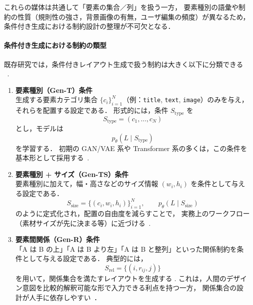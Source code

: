 \documentclass[a4j,12pt,dvipdfmx]{jsreport}
\begin{document}
これらの媒体は共通して「要素の集合／列」を扱う一方，
要素種別の語彙や制約の性質（規則性の強さ，背景画像の有無，ユーザ編集の頻度）が異なるため，
条件付き生成における制約設計の整理が不可欠となる．

\vspace{0.5em}
\paragraph{条件付き生成における制約の類型}
既存研究では，条件付きレイアウト生成で扱う制約は大きく以下に分類できる
~\cite{shi_understanding_2023}.

\begin{enumerate}
   \item \textbf{要素種別（Gen-T）条件}\\
         生成する要素カテゴリ集合 $\{c_i\}_{i=1}^{N}$（例：\texttt{title}, \texttt{text}, \texttt{image}）のみを与え，
         それらを配置する設定である．
         形式的には，条件 $S_{\text{type}}$ を
         \begin{equation}
            S_{\text{type}} = (c_1,\ldots,c_N)
         \end{equation}
         とし，モデルは
         \begin{equation}
            p_\theta(L \mid S_{\text{type}})
         \end{equation}
         を学習する．
         初期の GAN/VAE 系や Transformer 系の多くは，この条件を基本形として採用する~\cite{lee2020neuraldesign,jiang2023layoutformer}.

   \item \textbf{要素種別 + サイズ（Gen-TS）条件}\\
         要素種別に加えて，幅・高さなどのサイズ情報 $(w_i,h_i)$ を条件として与える設定である．
         \begin{equation}
            S_{\text{size}} = \{(c_i,w_i,h_i)\}_{i=1}^{N},
            \qquad
            p_\theta(L \mid S_{\text{size}})
         \end{equation}
         のように定式化され，配置の自由度を減らすことで，
         実務上のワークフロー（素材サイズが先に決まる等）に近づける~\cite{kong_blt_2022}.

   \item \textbf{要素間関係（Gen-R）条件}\\
         「A は B の上」「A は B より左」「A は B と整列」といった関係制約を条件として与える設定である．
         典型的には，
         \begin{equation}
            S_{\text{rel}} = \{(i,r_{ij},j)\}
         \end{equation}
         を用いて，関係集合を満たすレイアウトを生成する
         \cite{kikuchi_constrained_2021,jiang_layoutformer_2023}.
         これは，人間のデザイン意図を比較的解釈可能な形で入力できる利点を持つ一方，
         関係集合の設計が人手に依存しやすい~\cite{li2021attribute,kikuchi_constrained_2021}．


\end{enumerate}
\end{document}
